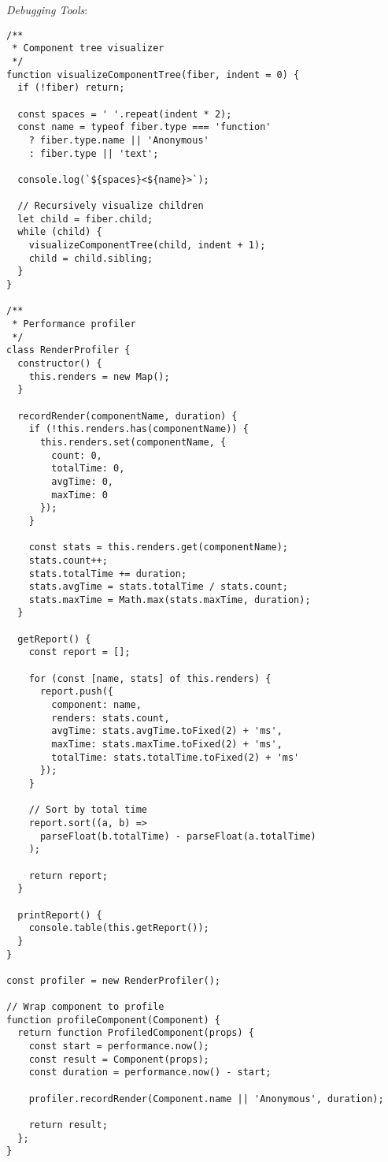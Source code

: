 \documentclass[11pt]{article}
\begin{document}
\emph{Debugging Tools}:

\begin{verbatim}
/**
 * Component tree visualizer
 */
function visualizeComponentTree(fiber, indent = 0) {
  if (!fiber) return;
  
  const spaces = ' '.repeat(indent * 2);
  const name = typeof fiber.type === 'function' 
    ? fiber.type.name || 'Anonymous'
    : fiber.type || 'text';
  
  console.log(`${spaces}<${name}>`);
  
  // Recursively visualize children
  let child = fiber.child;
  while (child) {
    visualizeComponentTree(child, indent + 1);
    child = child.sibling;
  }
}

/**
 * Performance profiler
 */
class RenderProfiler {
  constructor() {
    this.renders = new Map();
  }
  
  recordRender(componentName, duration) {
    if (!this.renders.has(componentName)) {
      this.renders.set(componentName, {
        count: 0,
        totalTime: 0,
        avgTime: 0,
        maxTime: 0
      });
    }
    
    const stats = this.renders.get(componentName);
    stats.count++;
    stats.totalTime += duration;
    stats.avgTime = stats.totalTime / stats.count;
    stats.maxTime = Math.max(stats.maxTime, duration);
  }
  
  getReport() {
    const report = [];
    
    for (const [name, stats] of this.renders) {
      report.push({
        component: name,
        renders: stats.count,
        avgTime: stats.avgTime.toFixed(2) + 'ms',
        maxTime: stats.maxTime.toFixed(2) + 'ms',
        totalTime: stats.totalTime.toFixed(2) + 'ms'
      });
    }
    
    // Sort by total time
    report.sort((a, b) => 
      parseFloat(b.totalTime) - parseFloat(a.totalTime)
    );
    
    return report;
  }
  
  printReport() {
    console.table(this.getReport());
  }
}

const profiler = new RenderProfiler();

// Wrap component to profile
function profileComponent(Component) {
  return function ProfiledComponent(props) {
    const start = performance.now();
    const result = Component(props);
    const duration = performance.now() - start;
    
    profiler.recordRender(Component.name || 'Anonymous', duration);
    
    return result;
  };
}
\end{verbatim}
\end{document}
